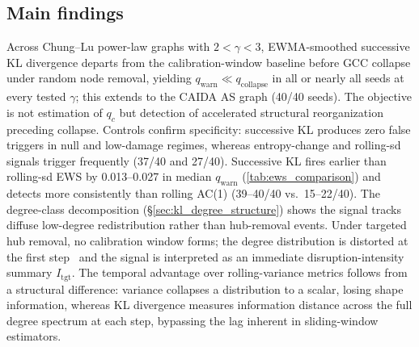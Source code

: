 \documentclass{nws}
\begin{document}
\subsection*{Main findings}
Across Chung--Lu power-law graphs with $2<\gamma<3$, EWMA-smoothed successive KL
divergence departs from the calibration-window baseline before GCC collapse under random
node removal, yielding $q_{\mathrm{warn}} \ll q_{\mathrm{collapse}}$ in all or nearly all
seeds at every tested $\gamma$; this extends to the CAIDA AS graph (40/40 seeds). The
objective is not estimation of $q_c$ but detection of accelerated structural
reorganization preceding collapse. Controls confirm specificity: successive KL produces
zero false triggers in null and low-damage regimes, whereas entropy-change and rolling-sd
signals trigger frequently (37/40 and 27/40). Successive KL fires earlier than rolling-sd
EWS by 0.013--0.027 in median $q_{\mathrm{warn}}$
(\autoref{tab:ews_comparison}) and detects more consistently than rolling AC(1) (39--40/40
vs.\ 15--22/40). The degree-class decomposition
(\S\ref{sec:kl_degree_structure}) shows the signal tracks diffuse low-degree
redistribution rather than hub-removal events. Under targeted hub removal, no calibration
window forms; the degree distribution is distorted at the first step~\citep{cohen2001breakdown}
and the signal is interpreted as an immediate disruption-intensity summary $I_{\mathrm{tgt}}$.
The temporal advantage over rolling-variance metrics follows from a structural difference:
variance collapses a distribution to a scalar, losing shape information, whereas KL
divergence measures information distance across the full degree spectrum at each step,
bypassing the lag inherent in sliding-window estimators.
\end{document}
